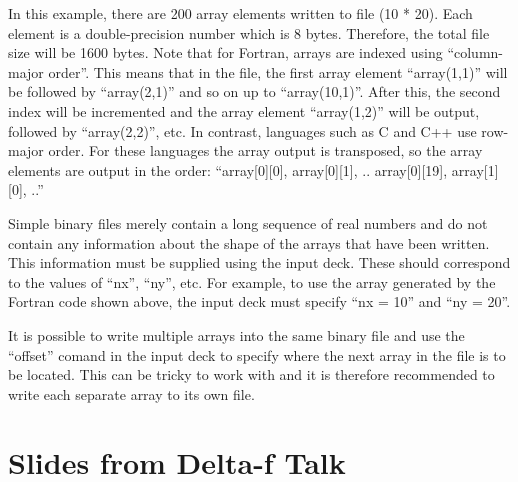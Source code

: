 In this example, there are 200 array elements written to file (10 * 20). Each
element is a double-precision number which is 8 bytes. Therefore, the total
file size will be 1600 bytes. Note that for Fortran, arrays are indexed using
``column-major order''. This means that in the file, the first array element
``array(1,1)'' will be followed by ``array(2,1)'' and so on up
to ``array(10,1)''. After this, the second index will be incremented and the
array element ``array(1,2)'' will be output, followed by ``array(2,2)'', etc.
In contrast, languages such as C and C++ use row-major order. For these
languages the array output is transposed, so the array elements are output
in the order: ``array[0][0], array[0][1], .. array[0][19], array[1][0], ..''

Simple binary files merely contain a long sequence of real numbers and do not
contain any information about the shape of the arrays that have been written.
This information must be supplied using the input deck. These should correspond
to the values of ``nx'', ``ny'', etc. For example, to use the array generated
by the Fortran code shown above, the input deck must specify ``nx = 10'' and
``ny = 20''.

It is possible to write multiple arrays into the same binary file and use
the ``offset'' comand in the input deck to specify where the next array in
the file is to be located. This can be tricky to work with and it is therefore
recommended to write each separate array to its own file.


\section{Slides from Delta-f Talk}
\label{sec:deltaf_slides}


{}




